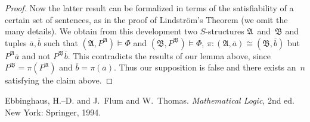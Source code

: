 \documentclass[letterpaper]{article}
\newcommand{\iso}{\cong}
\newcommand{\A}{\mathfrak{A}}
\newcommand{\B}{\mathfrak{B}}
\theoremstyle{remark}
\begin{document}
\begin{proof}
Now the latter result can be formalized in terms of the satisfiability of a certain set of sentences, as in the proof of Lindstr\"om's Theorem (we omit the many details). We obtain from this development two $S$-structures $\A$~and~$\B$ and tuples $\overline{a},\overline{b}$ such that $(\A,P^{\A})\models\Phi$ and $(\B,P^{\B})\models\Phi$, $\pi:(\A,\overline{a})\iso(\B,\overline{b})$ but $P^{\A}\overline{a}$ and not $P^{\B}\overline{b}$. This contradicts the results of our lemma above, since $P^{\B}=\pi(P^{\A})$ and $\overline{b}=\pi(\overline{a})$. Thus our supposition is false and there exists an~$n$ satisfying the claim above.
\end{proof}

\begin{thebibliography}{0}
 Ebbinghaus, H.--D. and J.~Flum and W.~Thomas. \emph{Mathematical Logic}, 2nd ed. New York: Springer, 1994.
\end{thebibliography}
\end{document}
